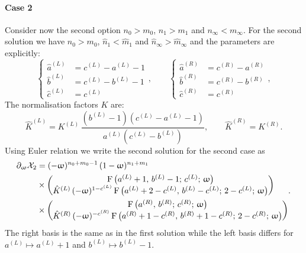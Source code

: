 \paragraph{Case 2}

Consider now the second option $n_{0} > m_{0}$, $n_{1} > m_{1}$ and $n_{\infty} < m_{\infty}$.
For the second solution we have $n_{0} > m_{0}$, $\hat{n}_{1} < \hat{m}_{1}$ and $\hat{n}_{\infty} > \hat{m}_{\infty}$ and the parameters are explicitly:
\begin{equation}
  \begin{cases}
    \hat{a}^{(L)} & = c^{(L)} - a^{(L)} - 1
    \\
    \hat{b}^{(L)} & = c^{(L)} - b^{(L)} - 1
    \\
    \hat{c}^{(L)} & = c^{(L)}
  \end{cases},
  \qquad
  \begin{cases}
    \hat{a}^{(R)} & = c^{(R)} - a^{(R)}
    \\
    \hat{b}^{(R)} & = c^{(R)} - b^{(R)}
    \\
    \hat{c}^{(R)} & = c^{(R)}
  \end{cases},
\end{equation}
The normalisation factors $K$ are:
\begin{equation}
  \hat{K}^{(L)}
  =
  K^{(L)}\,
  \frac{(b^{(L)} - 1)(c^{(L)} - a^{(L)} - 1)}{a^{(L)} (c^{(L)} - b^{(L)})},
  \qquad
  \hat{K}^{(R)}
  =
  K^{(R)}.
\end{equation}
Using Euler relation we write the second solution for the second case as
\begin{equation}
  \begin{split}
    \ipd{\omega} \cX_2
    & =
    (-\omega)^{n_{0} + m_{0} - 1}\,
    (1-\omega)^{n_{1} + m_{1}}\,
    \\
    & \times
    \mqty(
      \hyp{a^{(L)} + 1}{b^{(L)} - 1}{c^{(L)}}{\omega}
      \\
      \hat{K}^{(L)}\, (-\omega)^{1 - c^{(L)}}\,
      \hyp{a^{(L)} + 2 - c^{(L)}}{b^{(L)} - c^{(L)}}{2 - c^{(L)}}{\omega}
    )
    \\
    & \times
    \mqty(
      \hyp{a^{(R)}}{b^{(R)}}{c^{(R)}}{\omega}
      \\
      \hat{K}^{(R)}\, (-\omega)^{- c^{(R)}}\,
      \hyp{a^{(R)} + 1 - c^{(R)}}{b^{(R)} + 1 - c^{(R)}}{2 - c^{(R)}}{\omega}
    )
  \end{split}.
\end{equation}
The right basis is the same as in the first solution while the left basis differs for $a^{(L)} \mapsto a^{(L)} + 1$ and $b^{(L)} \mapsto b^{(L)} - 1$.


